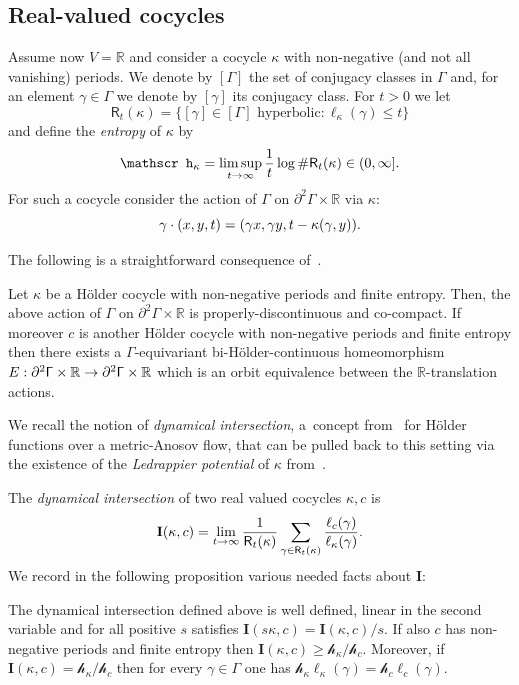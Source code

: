 \documentclass[AHL,Unicode,longabstracts,MathTools]{cedram}
\newcommand{\scr}{\mathscr}
\newcommand{\hJ}[1]{{\scr h}_{#1}}
\renewcommand{\sf}[1]{{\mathsf{#1}}}
\newcommand{\G}{\sf{\Gamma}}
\newcommand{\R}{\mathbb{R}}
\newcommand{\II}{\mathbf{I}}
\newcommand{\g}{\gamma}
\newcommand{\bord}{\partial}
\renewcommand{\/}{\backslash}
\newcommand{\<}{\langle}
\renewcommand{\>}{\rangle}
\renewcommand*{\to}{\mathchoice{\longrightarrow}{\rightarrow}{\rightarrow}{\rightarrow}}
\let\originalleft\left
\let\originalright\right
\renewcommand{\left}{\mathopen{}\mathclose\bgroup\originalleft}
\renewcommand{\right}{\aftergroup\egroup\originalright}
\begin{document}
\subsection{Real-valued cocycles}\label{Sreal}



Assume now $V=\R$ and consider a cocycle $\kappa$ with non-negative (and not all vanishing) periods. We denote by $[\G]$ the set of conjugacy classes in $\G$ and, for an element $\g\in\G$ we denote by $[\g]$ its conjugacy class. For $t>0$ we let
\[
\sf R_t(\kappa)=\bigl\{[\g]\in[\G]\text{ hyperbolic}:\ell_\kappa(\g)\leq t\bigr\}
\]
and define the \emph{entropy} of $\kappa$ by
\[
\hJ\kappa=\limsup_{t\to\infty}\frac1t\log\#\sf R_t(\kappa)\in(0,\infty].
\]
For such a cocycle consider the action of $\G$ on $\bord^2\G\times\R$ via $\kappa$:
\begin{equation}\label{gaction}
\g\cdot(x,y,t)=\left(\g x,\g y,t-\kappa\left(\g,y\right)\right).
\end{equation}


The following is a straightforward consequence of~\cite[Theorem~3.2.2]{dichotomy}.


\begin{prop}\label{-infty}
Let $\kappa$ be a H\"older cocycle with non-negative periods and finite entropy. Then, the above action of $\G$ on $\bord^2\G\times\R$ is properly-discontinuous and co-compact. If moreover $c$ is another H\"older cocycle with non-negative periods and finite entropy then there exists a $\G$-equivariant bi-H\"older-continuous homeomorphism $E:\bord^2\G\times\R\to\bord^2\G\times\R$ which is an orbit equivalence between the $\R$-translation actions.
\end{prop}


We recall the notion of \emph{dynamical intersection}, a~concept from~\cite{pressure} %
for H\"older functions over a metric-Anosov flow, that can be pulled back to this setting via the existence of the \emph{Ledrappier potential} of $\kappa$ from~\cite[Section~3.1]{dichotomy}.


The \emph{dynamical intersection} of two real valued cocycles $\kappa, c$ is
\begin{equation}\label{defiII}
\II(\kappa,c)=\lim_{t\to\infty}\frac1{\sf R_t(\kappa)}\sum_{\g\in\sf R_t(\kappa)}\frac{\ell_c(\g)}{\ell_\kappa(\g)}.
\end{equation}
We record in the following proposition various needed facts about $\II$:

\begin{prop}\label{ineq}
The dynamical intersection defined above is well defined, linear in the second variable and for all positive $s$ satisfies $\II(s\kappa,c)=\II(\kappa,c)/s$. If also $c$ has non-negative periods and finite entropy then $\II(\kappa,c)\geq \hJ\kappa/\hJ c$. Moreover, if $\II(\kappa,c)= \hJ\kappa/\hJ c$ then for every $\g\in\G$ one has $\hJ\kappa\ell_\kappa(\g)=\hJ c\ell_c(\g)$.
\end{prop}
\end{document}
